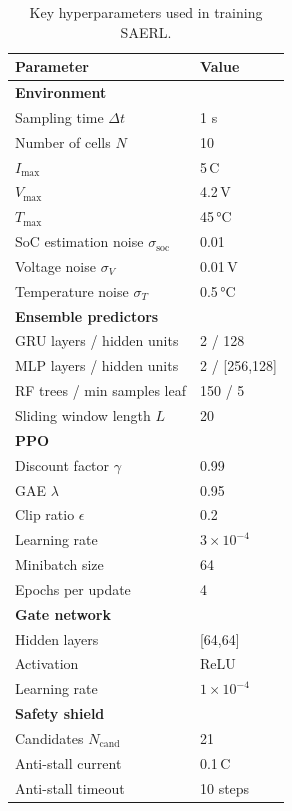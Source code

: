 \documentclass[%
 aip,
 amsmath,amssymb,
reprint, onecolumn %
]{revtex4-1}
\begin{document}
\begin{table}[H]
\centering
\caption{Key hyperparameters used in training SAERL.}
\label{tab:hyperparams}
\begin{tabular}{ll}
\toprule
Parameter & Value \\
\midrule
\textbf{Environment} & \\
Sampling time $\Delta t$ & 1 s \\
Number of cells $N$ & 10 \\
$I_{\max}$ & 5\,C \\
$V_{\max}$ & 4.2\,V \\
$T_{\max}$ & 45\,°C \\
SoC estimation noise $\sigma_{\mathrm{soc}}$ & 0.01 \\
Voltage noise $\sigma_V$ & 0.01\,V \\
Temperature noise $\sigma_T$ & 0.5\,°C \\
\textbf{Ensemble predictors} & \\
GRU layers / hidden units & 2 / 128 \\
MLP layers / hidden units & 2 / [256,128] \\
RF trees / min samples leaf & 150 / 5 \\
Sliding window length $L$ & 20 \\
\textbf{PPO} & \\
Discount factor $\gamma$ & 0.99 \\
GAE $\lambda$ & 0.95 \\
Clip ratio $\epsilon$ & 0.2 \\
Learning rate & $3\times10^{-4}$ \\
Minibatch size & 64 \\
Epochs per update & 4 \\
\textbf{Gate network} & \\
Hidden layers & [64,64] \\
Activation & ReLU \\
Learning rate & $1\times10^{-4}$ \\
\textbf{Safety shield} & \\
Candidates $N_{\mathrm{cand}}$ & 21 \\
Anti-stall current & 0.1\,C \\
Anti-stall timeout & 10 steps \\
\bottomrule
\end{tabular}
\end{table}


\nocite{*}

\end{document}
